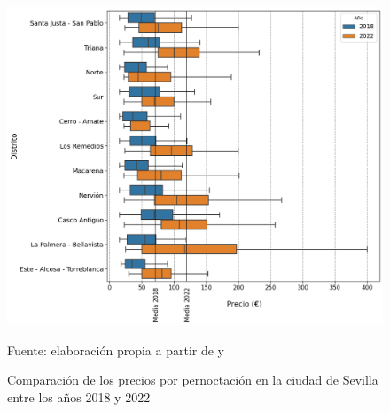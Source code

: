 \documentclass[a4paper,10pt]{article}
\begin{document}
            \begin{figure}[ht]
                \begin{flushleft}
                    \includegraphics*[width = 15cm]{graphics/seville_comparison_price.png}
                    \begin{flushright}
                        \footnotesize{Fuente: elaboración propia a partir de \cite[(2)]{datahippo} y \cite[(1)]{insideairbnb}}
                    \end{flushright}
                    \caption{Comparación de los precios por pernoctación en la ciudad de Sevilla entre los años 2018 y 2022}
                \end{flushleft}


\end{figure}
\end{document}
